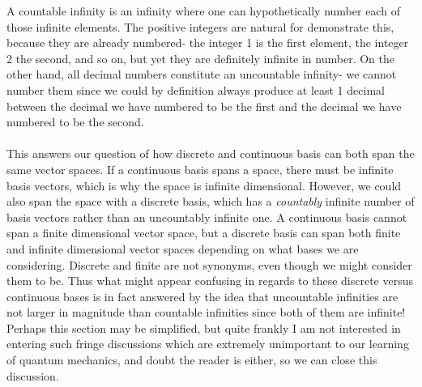 A countable infinity is an infinity where one can hypothetically number each of those infinite elements. The positive integers are natural for demonstrate this, because they are already numbered- the integer 1 is the first element, the integer 2 the second, and so on, but yet they are definitely infinite in number. On the other hand, all decimal numbers constitute an uncountable infinity- we cannot number them since we could by definition always produce at least 1 decimal between the decimal we have numbered to be the first and the decimal we have numbered to be the second.
\\\\
This answers our question of how discrete and continuous basis can both span the same vector spaces. If a continuous basis spans a space, there must be infinite basis vectors, which is why the space is infinite dimensional. However, we could also span the space with a discrete basis, which has a \textit{countably} infinite number of basis vectors rather than an uncountably infinite one. A continuous basis cannot span a finite dimensional vector space, but a discrete basis can span both finite and infinite dimensional vector spaces depending on what bases we are considering. Discrete and finite are not synonyms, even though we might consider them to be. Thus what might appear confusing in regards to these discrete versus continuous bases is in fact answered by the idea that uncountable infinities are not larger in magnitude than countable infinities since both of them are infinite! Perhaps this section may be simplified, but quite frankly I am not interested in entering such fringe discussions which are extremely unimportant to our learning of quantum mechanics, and doubt the reader is either, so we can close this discussion.
